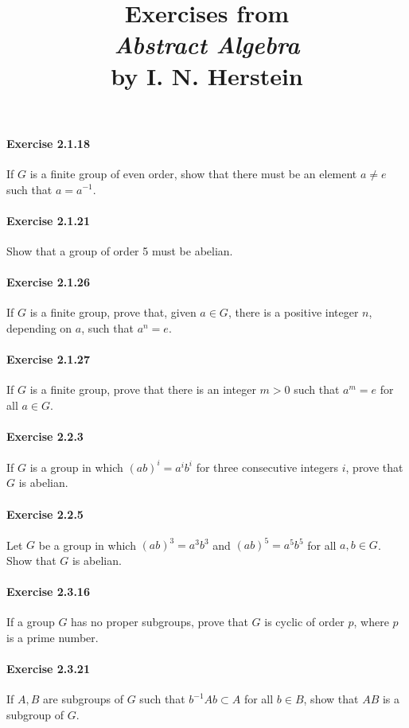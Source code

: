 \documentclass{article}
\title{\textbf{
Exercises from \\
\textit{Abstract Algebra} \\
by I. N. Herstein
}}
\date{}
\begin{document}
\maketitle

\paragraph{Exercise 2.1.18} If $G$ is a finite group of even order, show that there must be an element $a \neq e$ such that $a=a^{-1}$.

\paragraph{Exercise 2.1.21} Show that a group of order 5 must be abelian.

\paragraph{Exercise 2.1.26} If $G$ is a finite group, prove that, given $a \in G$, there is a positive integer $n$, depending on $a$, such that $a^n = e$.

\paragraph{Exercise 2.1.27} If $G$ is a finite group, prove that there is an integer $m > 0$ such that $a^m = e$ for all $a \in G$.

\paragraph{Exercise 2.2.3} If $G$ is a group in which $(a b)^{i}=a^{i} b^{i}$ for three consecutive integers $i$, prove that $G$ is abelian.

\paragraph{Exercise 2.2.5} Let $G$ be a group in which $(a b)^{3}=a^{3} b^{3}$ and $(a b)^{5}=a^{5} b^{5}$ for all $a, b \in G$. Show that $G$ is abelian.

\paragraph{Exercise 2.3.16} If a group $G$ has no proper subgroups, prove that $G$ is cyclic of order $p$, where $p$ is a prime number.

\paragraph{Exercise 2.3.21} If $A, B$ are subgroups of $G$ such that $b^{-1} Ab \subset A$ for all $b \in B$, show that $AB$ is a subgroup of $G$.
\end{document}
